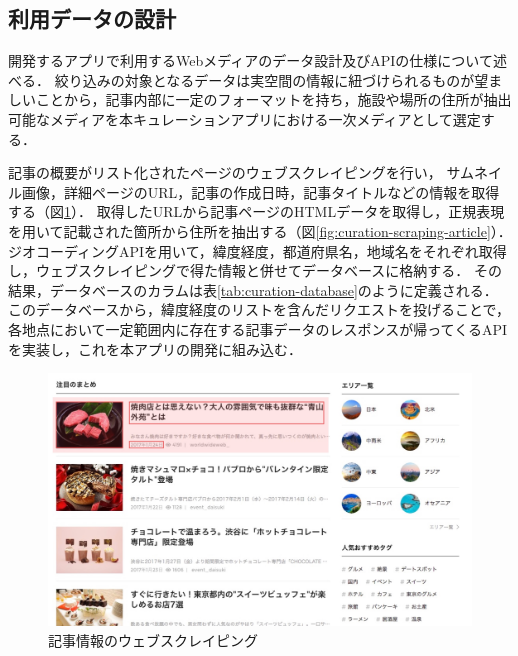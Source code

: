 \documentclass[a4paper]{jsarticle}
\begin{document}
\begin{enumerate}
\begin{enumerate}
\subsection{利用データの設計}
開発するアプリで利用するWebメディアのデータ設計及びAPIの仕様について述べる．
絞り込みの対象となるデータは実空間の情報に紐づけられるものが望ましいことから，記事内部に一定のフォーマットを持ち，施設や場所の住所が抽出可能なメディアを本キュレーションアプリにおける一次メディアとして選定する．


記事の概要がリスト化されたページのウェブスクレイピングを行い，
サムネイル画像，詳細ページのURL，記事の作成日時，記事タイトルなどの情報を取得する（図\ref{fig:curation-scraping-list}）．
取得したURLから記事ページのHTMLデータを取得し，正規表現を用いて記載された箇所から住所を抽出する（図\ref{fig:curation-scraping-article}）．
ジオコーディングAPIを用いて，緯度経度，都道府県名，地域名をそれぞれ取得し，ウェブスクレイピングで得た情報と併せてデータベースに格納する．
その結果，データベースのカラムは表\ref{tab:curation-database}のように定義される．
このデータベースから，緯度経度のリストを含んだリクエストを投げることで，各地点において一定範囲内に存在する記事データのレスポンスが帰ってくるAPIを実装し，これを本アプリの開発に組み込む．

\fifigure
\begin{figure}[H]
  \begin{center}
    \includegraphics[width=0.95\hsize]{./images/curation_scraping_list.jpg}
    \caption{記事情報のウェブスクレイピング}
    \label{fig:curation-scraping-list}
  \end{center}
\end{figure}
\fi


\end{enumerate}
\end{enumerate}
\end{document}
